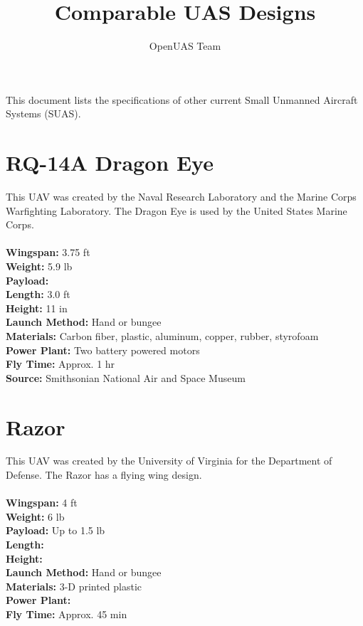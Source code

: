 \documentclass{article}
\begin{document}
\title{\textbf{Comparable UAS Designs}}
\author{OpenUAS Team}
\maketitle

This document lists the specifications of other current Small Unmanned Aircraft Systems (SUAS).

\section{RQ-14A Dragon Eye}

This UAV was created by the Naval Research Laboratory and the Marine Corps Warfighting Laboratory. The Dragon Eye is used by the United States Marine Corps.\\\\
\textbf{Wingspan:} 3.75 ft\\
\textbf{Weight:} 5.9 lb\\
\textbf{Payload:} \\
\textbf{Length:} 3.0 ft\\
\textbf{Height:} 11 in\\
\textbf{Launch Method:} Hand or bungee\\
\textbf{Materials:} Carbon fiber, plastic, aluminum, copper, rubber, styrofoam\\
\textbf{Power Plant:} Two battery powered motors\\
\textbf{Fly Time:} Approx. 1 hr\\

\textbf{Source:} Smithsonian National Air and Space Museum

\section{Razor}

This UAV was created by the University of Virginia for the Department of Defense. The Razor has a flying wing design.\\\\
\textbf{Wingspan:} 4 ft\\
\textbf{Weight:} 6 lb\\
\textbf{Payload:} Up to 1.5 lb\\
\textbf{Length:} \\
\textbf{Height:}\\
\textbf{Launch Method:} Hand or bungee\\
\textbf{Materials:} 3-D printed plastic\\
\textbf{Power Plant:} \\
\textbf{Fly Time:} Approx. 45 min\\
\end{document}
